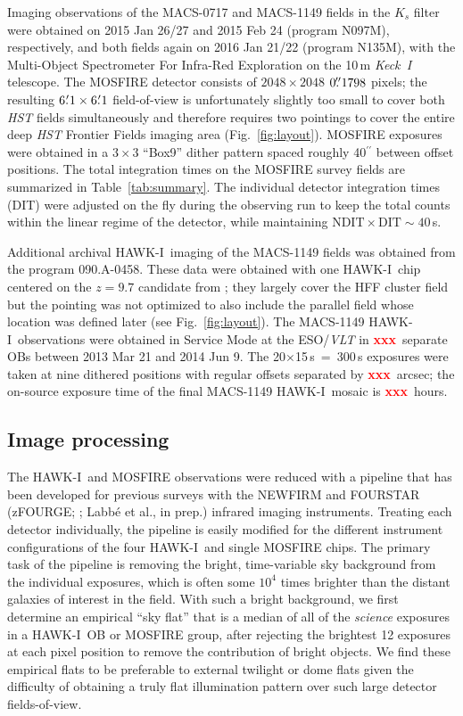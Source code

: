 \documentclass[preprint2]{aastex6}
\newcommand\xxx{{\textcolor{red}{\bf xxx}}}
\gdef\HAWKI{\mbox{HAWK-I}}
\begin{document}
Imaging observations of the MACS-0717 and MACS-1149 fields in the $K_s$ filter were obtained on 2015 Jan 26/27 and 2015 Feb 24 (program N097M), respectively, and both fields again on 2016 Jan 21/22 (program N135M), with the Multi-Object Spectrometer For Infra-Red Exploration \citep[MOSFIRE;][]{mosfire} on the 10\,m \mbox{\textit{Keck I}} telescope.  The MOSFIRE detector consists of $2048\times2048$ $0\mbox{$.\!\!^{\prime\prime}$}1798$ pixels; the resulting $6\mbox{$.\mkern-4mu^\prime$}1\times6\mbox{$.\mkern-4mu^\prime$}1$ field-of-view is unfortunately slightly too small to cover both \textit{HST} fields simultaneously and therefore requires two pointings to cover the entire deep \textit{HST} Frontier Fields imaging area (Fig.~\ref{fig:layout}).  MOSFIRE exposures were obtained in a $3\times3$ ``Box9'' dither pattern spaced roughly 40$^{\prime\prime}$ between offset positions.  The total integration times on the MOSFIRE survey fields are summarized in Table~\ref{tab:summary}.  The individual detector integration times (DIT) were adjusted on the fly during the observing run to keep the total counts within the linear regime of the detector, while maintaining $\mathrm{NDIT}\times\mathrm{DIT} \sim 40$\,s.


Additional archival \HAWKI\ imaging of the MACS-1149 fields was obtained from the program 090.A-0458.  These data were obtained with one \HAWKI\ chip centered on the $z=9.7$ candidate from \cite{zheng:12}; they largely cover the HFF cluster field but the pointing was not optimized to also include the parallel field whose location was defined later (see Fig.~\ref{fig:layout}).  The MACS-1149 \HAWKI\ observations were obtained in Service Mode at the ESO/\textit{VLT} in \xxx\ separate OBs between 2013 Mar 21 and 2014 Jun 9.  The 20$\times$15\,s~=~300\,s exposures were taken at nine dithered positions with regular offsets separated by \xxx\ arcsec; the on-source exposure time of the final MACS-1149 \HAWKI\ mosaic is \xxx\ hours.

\subsection{Image processing}
\label{s:processing}


The \HAWKI\ and MOSFIRE observations were reduced with a pipeline that has been developed for previous surveys with the NEWFIRM \citep[NMBS;][]{whitaker:nmbs} and FOURSTAR (zFOURGE; \citealt{spitler:12}; Labb\'e et al., in prep.) infrared imaging instruments.  Treating each detector individually, the pipeline is easily modified for the different instrument configurations of the four \HAWKI\ and single MOSFIRE chips.  The primary task of the pipeline is removing the bright, time-variable sky background from the individual exposures, which is often some $10^4$ times brighter than the distant galaxies of interest in the field.  With such a bright background, we first determine an empirical ``sky flat'' that is a median of all of the \textit{science} exposures in a \HAWKI\ OB or MOSFIRE group, after rejecting the brightest 12 exposures at each pixel position to remove the contribution of bright objects.  We find these empirical flats to be preferable to external twilight or dome flats given the difficulty of obtaining a truly flat illumination pattern over such large detector fields-of-view.  
\end{document}
